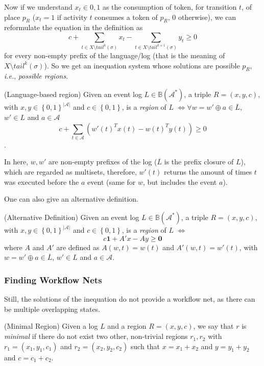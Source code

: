 \documentclass[a4paper]{report}
\begin{document}
Now if we understand $x_t\in {0,1}$ as the consumption of token, for transition $t$, of place $p_R$ ($x_t = 1$ if activity  $t$ consumes a token of $p_R$, $0$ otherwise), we can reformulate the equation in the definition as \[
    c + \sum_{t\in X\setminus tail^{k}(\sigma)}x_t - \sum_{t\in X\setminus tail^{k+1}(\sigma)}y_t \ge 0
\] for every non-empty prefix of the language/log (that is the meaning of $X\setminus tail^{k}(\sigma)$). So we get an inequation system whose solutions are possible $p_R$, \emph{i.e.}, \emph{possible regions}.

\begin{definition}
    (Language-based region) Given an event log $L\in \mathbb{B}(\mathcal{A}^{*})$, a triple $R=(x,y,c)$, with $x,y \in \left\{ 0,1 \right\}^{|\mathcal{A}|}$ and $c\in \left\{0,1\right\}$, is a \emph{region} of $L$ $\iff \forall w=w'\oplus a \in \overline{L}$, $w'\in L$ and $a\in \mathcal{A}$ \[
	c + \sum_{t\in \mathcal{A}}\left( w'(t)^{T}x(t) - w(t)^{T}y(t) \right) \ge 0
    \].
\end{definition}

In here, $w,w'$ are non-empty prefixes of the log ($\overline{L}$ is the prefix closure of $L$), which are regarded as multisets, therefore, $w'(t)$ returns the amount of times $t$ was executed before the $a$ event (same for $w$, but includes the event $a$).

One can also give an alternative definition.

\begin{definition}
    (Alternative Definition) Given an event log $L\in \mathbb{B}(\mathcal{A}^{*})$, a triple $R=(x,y,c)$, with $x,y \in \left\{ 0,1 \right\}^{|\mathcal{A}|}$ and $c\in \left\{0,1\right\}$, is a \emph{region} of $L$ $\iff$ \[
	c \bm{1} + A'x - Ay \ge \bm{0}
	\] where $A$ and $A'$ are defined as $A(w,t) = w(t)$ and $A'(w,t)=w'(t)$, with  $w=w'\oplus a \in \overline{L}$, $w'\in L$ and $a\in \mathcal{A}$.
\end{definition}

\subsubsection*{Finding Workflow Nets}

Still, the solutions of the inequation do not provide a workflow net, as there can be multiple overlapping states.

\begin{definition}
    (Minimal Region) Given a log  $L$ and a region $R=(x,y,c)$, we say that $r$ is \emph{minimal} if there do not exist two other, non-trivial regions $r_1,r_2$ with $r_1=(x_1,y_1,c_1)$ and $r_2=(x_2,y_2,c_2)$ such that $x = x_1+x_2$ and $y=y_1+y_2$ and $c=c_1+c_2$.
\end{definition}
\end{document}
